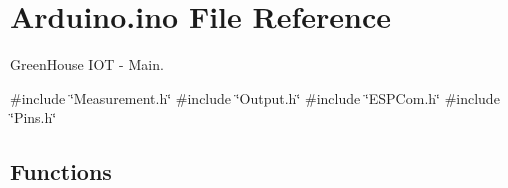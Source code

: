 \hypertarget{_arduino_8ino}{}\section{Arduino.\+ino File Reference}
\label{_arduino_8ino}


Green\+House I\+OT -\/ Main.  


{\ttfamily \#include \char`\"{}Measurement.\+h\char`\"{}}\newline
{\ttfamily \#include \char`\"{}Output.\+h\char`\"{}}\newline
{\ttfamily \#include \char`\"{}E\+S\+P\+Com.\+h\char`\"{}}\newline
{\ttfamily \#include \char`\"{}Pins.\+h\char`\"{}}\newline
\subsection*{Functions}
